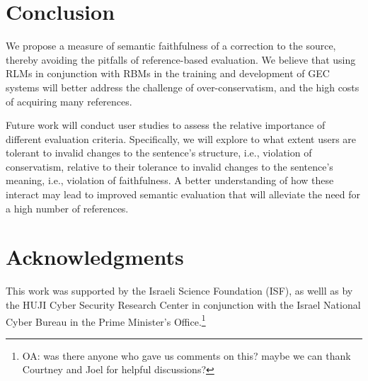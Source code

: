\documentclass[a4paper, 11pt]{article}
\newcommand{\oa}[1]{\footnote{\color{red}OA: #1}}
\begin{document}
\section{Conclusion}

We propose a measure of semantic faithfulness of a correction to the source,
thereby avoiding the pitfalls of reference-based evaluation. 
We believe that using RLMs in conjunction with RBMs in the training and development of GEC
systems will better address the challenge of over-conservatism, and the 
high costs of acquiring many references.

Future work will conduct user studies to assess the relative importance
of different evaluation criteria.
Specifically, we will explore to what extent users are
tolerant to invalid changes to the sentence's structure, i.e.,
violation of conservatism, relative to their tolerance to invalid changes 
to the sentence's meaning, i.e., violation of faithfulness.
A better understanding of how these interact
may lead to improved semantic evaluation that will alleviate the need
for a high number of references.

\section*{Acknowledgments}

This work was supported by the Israeli Science Foundation (ISF),
as welll as by the HUJI Cyber Security Research Center in conjunction with the Israel
National Cyber Bureau in the Prime Minister's Office.\oa{was there anyone who gave us comments on this? maybe we can thank
Courtney and Joel for helpful discussions?}




\end{document}
